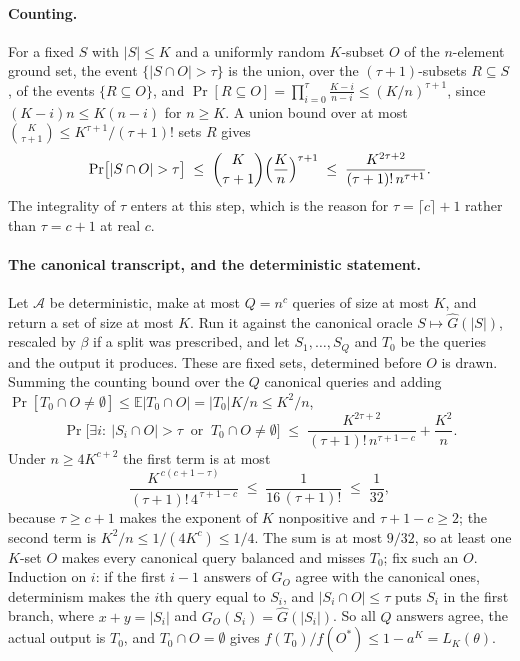\paragraph{Counting.}
For a fixed $S$ with $|S|\le K$ and a uniformly random $K$-subset $O$ of the
$n$-element ground set, the event $\{|S\cap O|>\tau\}$ is the union, over the
$(\tau+1)$-subsets $R\subseteq S$, of the events $\{R\subseteq O\}$, and
$\Pr[R\subseteq O]=\prod_{i=0}^{\tau}\frac{K-i}{n-i}\le(K/n)^{\tau+1}$, since
$(K-i)n\le K(n-i)$ for $n\ge K$.  A union bound over at most
$\binom{K}{\tau+1}\le K^{\tau+1}/(\tau+1)!$ sets $R$ gives
\[
  \Pr\bigl[|S\cap O|>\tau\bigr]
  \;\le\;\binom{K}{\tau+1}\Bigl(\frac Kn\Bigr)^{\tau+1}
  \;\le\;\frac{K^{2\tau+2}}{(\tau+1)!\,n^{\tau+1}} .
\]
The integrality of $\tau$ enters at this step, which is the reason for
$\tau=\lceil c\rceil+1$ rather than $\tau=c+1$ at real $c$.

\paragraph{The canonical transcript, and the deterministic statement.}
Let $\mathcal A$ be deterministic, make at most $Q=n^{c}$ queries of size at
most $K$, and return a set of size at most $K$.  Run it against the canonical
oracle $S\mapsto\hat G(|S|)$, rescaled by $\beta$ if a split was prescribed,
and let $S_1,\dots,S_Q$ and $T_0$ be the queries and the output it produces.
These are fixed sets, determined before $O$ is drawn.  Summing the counting
bound over the $Q$ canonical queries and adding
$\Pr[T_0\cap O\ne\emptyset]\le\mathbb E|T_0\cap O|=|T_0|K/n\le K^{2}/n$,
\[
  \Pr\bigl[\exists i:\ |S_i\cap O|>\tau\ \text{ or }\ T_0\cap O\ne\emptyset\bigr]
  \;\le\;\frac{K^{2\tau+2}}{(\tau+1)!\,n^{\tau+1-c}}+\frac{K^{2}}{n} .
\]
Under $n\ge4K^{c+2}$ the first term is at most
\[
  \frac{K^{\,c(c+1-\tau)}}{(\tau+1)!\,4^{\,\tau+1-c}}
  \;\le\;\frac1{16\,(\tau+1)!}\;\le\;\frac1{32},
\]
because $\tau\ge c+1$ makes the exponent of $K$ nonpositive and
$\tau+1-c\ge2$; the second term is $K^{2}/n\le1/(4K^{c})\le1/4$.  The sum is
at most $9/32$, so at least one $K$-set $O$ makes every canonical query
balanced and misses $T_0$; fix such an $O$.  Induction on $i$: if the first
$i-1$ answers of $G_O$ agree with the canonical ones, determinism makes the
$i$th query equal to $S_i$, and $|S_i\cap O|\le\tau$ puts $S_i$ in the first
branch, where $x+y=|S_i|$ and $G_O(S_i)=\hat G(|S_i|)$.  So all $Q$ answers
agree, the actual output is $T_0$, and $T_0\cap O=\emptyset$ gives
$f(T_0)/f(O^{\ast})\le1-a^{K}=L_K(\theta)$.

